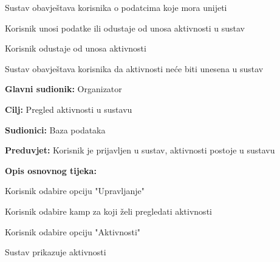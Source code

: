 \begin{packed_item}
\begin{packed_item}
\begin{packed_enum}
								\item Sustav obavještava korisnika o podatcima koje mora unijeti
								\item Korisnik unosi podatke ili odustaje od unosa aktivnosti u sustav
								
							\end{packed_enum}
							\item[3.a] Korisnik odustaje od unosa aktivnosti
							\item[] \begin{packed_enum}
								
								\item Sustav obavještava korisnika da aktivnosti neće biti unesena u sustav
								
							\end{packed_enum}
							
						\end{packed_item}
					\end{packed_item}
					
					\noindent {}
					\begin{packed_item}
						
						\item \textbf{Glavni sudionik: }Organizator
						\item  \textbf{Cilj:} Pregled aktivnosti u sustavu
						\item  \textbf{Sudionici:} Baza podataka
						\item  \textbf{Preduvjet:} Korisnik je prijavljen u sustav, aktivnosti postoje u sustavu
						\item  \textbf{Opis osnovnog tijeka:}
						
						\item[] \begin{packed_enum}
							
							\item Korisnik odabire opciju "Upravljanje"
							\item Korisnik odabire kamp za koji želi pregledati aktivnosti
							\item Korisnik odabire opciju "Aktivnosti"
							\item Sustav prikazuje aktivnosti
						\end{packed_enum}
						
						
					\end{packed_item}
				
